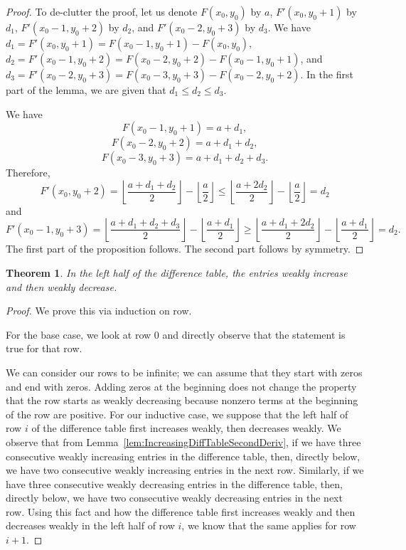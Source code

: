 \documentclass[11pt]{article}
\newtheorem{theorem}{Theorem}[section] %
\theoremstyle{definition}
\theoremstyle{remark}
\newcommand{\floor}[1]{\left\lfloor #1 \right\rfloor}
\begin{document}
\begin{proof}
To de-clutter the proof, let us denote $F(x_0,y_0)$ by $a$, $F'(x_0, y_0+1)$ by $d_1$, $F'(x_0-1, y_0+2)$ by $d_2$, and $F'(x_0-2, y_0+3)$ by $d_3$. We have $d_1 = F'(x_0, y_0+1) = F(x_0-1, y_0+1) - F(x_0,  y_0)$, $d_2 = F'(x_0-1, y_0+2) = F(x_0-2, y_0+2) - F(x_0-1, y_0+1)$, and $d_3 = F'(x_0-2, y_0+3) = F(x_0-3, y_0+3) - F(x_0-2, y_0+2)$. In the first part of the lemma, we are given that $d_1 \le d_2 \le d_3$.

We have
\[F(x_0-1, y_0+1) = a + d_1,\]
\[F(x_0-2, y_0+2) = a + d_1 + d_2,\]
\[F(x_0-3, y_0+3) = a + d_1 + d_2 + d_3.\]
Therefore,
\[F'(x_0, y_0+2) = \floor{\frac{a + d_1 + d_2}{2}} - \floor{\frac{a}{2}} \le \floor{\frac{a + 2d_2}{2}} - \floor{\frac{a}{2}} = d_2\]
and
\[F'(x_0-1, y_0+3) = \floor{\frac{a + d_1 + d_2 + d_3}{2}} - \floor{\frac{a+d_1}{2}} \ge \floor{\frac{a + d_1 + 2d_2}{2}} - \floor{\frac{a+d_1}{2}} = d_2.\]
The first part of the proposition follows. The second part follows by symmetry.
\end{proof}

\begin{theorem}
    In the left half of the difference table, the entries weakly increase and then weakly decrease.
\end{theorem}

\begin{proof}
We prove this via induction on row. 

For the base case, we look at row $0$ and directly observe that the statement is true for that row.

We can consider our rows to be infinite; we can assume that they start with zeros and end with zeros. Adding zeros at the beginning does not change the property that the row starts as weakly decreasing because nonzero terms at the beginning of the row are positive. For our inductive case, we suppose that the left half of row $i$ of the difference table first increases weakly, then decreases weakly. We observe that from Lemma~\ref{lem:IncreasingDiffTableSecondDeriv}, if we have three consecutive weakly increasing entries in the difference table, then, directly below, we have two consecutive weakly increasing entries in the next row.  Similarly, if we have three consecutive weakly decreasing entries in the difference table, then, directly below, we have two consecutive weakly decreasing entries in the next row. Using this fact and how the difference table first increases weakly and then decreases weakly in the left half of row $i$, we know that the same applies for row $i+1$.
\end{proof}
\end{document}
